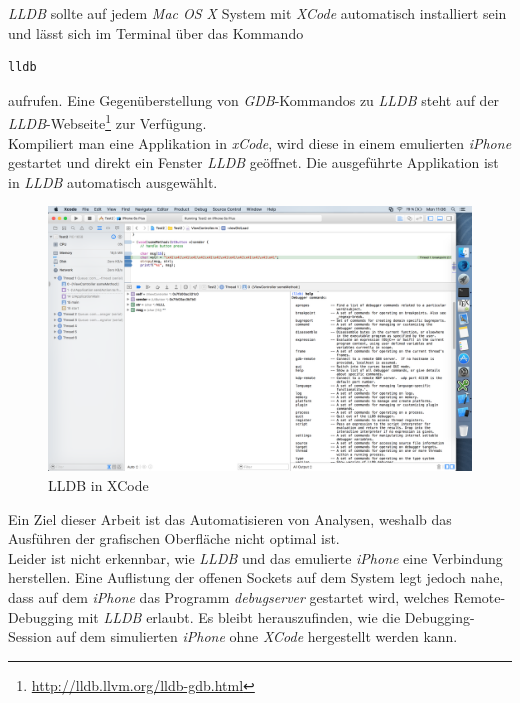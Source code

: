 \textit{LLDB} sollte auf jedem \textit{Mac OS X} System mit \textit{XCode} automatisch installiert sein und lässt sich im Terminal über das Kommando
\begin{lstlisting}
lldb
\end{lstlisting} aufrufen. Eine Gegenüberstellung von \textit{GDB}-Kommandos zu \textit{LLDB} steht auf der \textit{LLDB}-Webseite\footnote{\url{http://lldb.llvm.org/lldb-gdb.html}} zur Verfügung.\\

 Kompiliert man eine Applikation in \textit{xCode}, wird diese in einem emulierten \textit{iPhone} ge\-star\-tet und direkt ein Fenster \textit{LLDB} geöffnet. Die ausgeführte Applikation ist in \textit{LLDB} automatisch ausgewählt.\\

\begin{figure}[htbp]
	\centering
	\includegraphics[width=\textwidth]{bilder/pentest_mobile_anwendungen/vergleich_aktuelle_situation/20160627_XCode-LLDB.png}
	\caption{LLDB in XCode}
	\label{fig:LLDBinXCode}
\end{figure}
Ein Ziel dieser Arbeit ist das Automatisieren von Analysen, weshalb das Ausführen der grafischen Oberfläche nicht optimal ist.\\

Leider ist nicht erkennbar, wie \textit{LLDB} und das emulierte \textit{iPhone} eine Verbindung herstellen. Eine Auflistung der offenen Sockets auf dem System legt jedoch nahe, dass auf dem \textit{iPhone} das Programm \textit{debugserver} gestartet wird, welches Remote-Debugging mit \textit{LLDB} erlaubt. Es bleibt herauszufinden, wie die Debugging-Session auf dem simulierten \textit{iPhone} ohne \textit{XCode} hergestellt werden kann.\\

